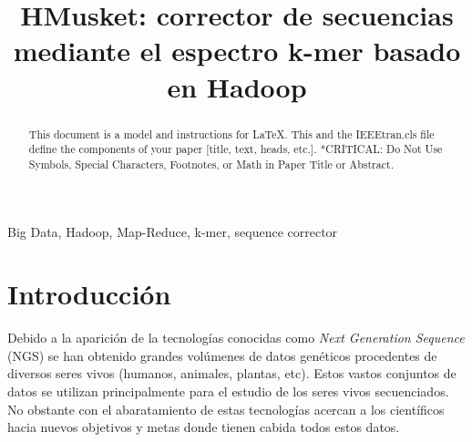 \documentclass[conference]{IEEEtran}
\begin{document}
\title{HMusket: corrector de secuencias mediante el espectro k-mer basado en Hadoop}

\author{
\and
{}
\and
{}
}

\maketitle

\begin{abstract}
This document is a model and instructions for \LaTeX.
This and the IEEEtran.cls file define the components of your paper [title, text, heads, etc.]. *CRITICAL: Do Not Use Symbols, Special Characters, Footnotes, 
or Math in Paper Title or Abstract.
\end{abstract}

\begin{IEEEkeywords}
Big Data, Hadoop, Map-Reduce, k-mer, sequence corrector
\end{IEEEkeywords}

\section{Introducción}
Debido a la aparición de la tecnologías conocidas como \textit{Next Generation Sequence} (NGS) se han obtenido grandes volúmenes de datos genéticos procedentes de diversos seres vivos (humanos, animales, plantas, etc). Estos vastos conjuntos de datos se utilizan principalmente para el estudio de los seres vivos secuenciados. 
No obstante con el abaratamiento de estas tecnologías acercan a los científicos hacia nuevos objetivos y metas donde tienen cabida todos estos datos.
\\
\end{document}
